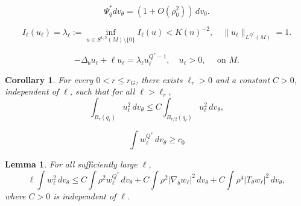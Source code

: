 \documentclass[10pt,a4paper]{amsart}
\newtheorem{corollary}{Corollary}
\newtheorem{lemma}{Lemma}
\begin{document}
\begin{equation}\label{eq:JL-volume-comparison}
\Psi_q^*dv_\theta
=
(1+O(\rho_0^2))\,dv_0 .
\end{equation}

		\begin{equation}\label{eqnmin}
			I_\ell(u_\ell)=\lambda_\ell:=\inf_{u\in S^{1,2}(M)\setminus\{0\}} I_\ell(u)<K(n)^{-2},\quad\|u_\ell\|_{L^{Q^*}(M)}=1.
		\end{equation}

		\begin{equation}\label{eqnEL}
			-\Delta_b u_\ell+\ell u_\ell=\lambda_\ell u_\ell^{Q^*-1}, \quad u_\ell > 0, \quad \text { on } M .
		\end{equation}

	\begin{corollary}\label{estimatering}
		For every \(0 < r \le r_G\), there exists  \(\ell_r>0\) and a constant \(C>0\), independent of \(\ell\), such that for all \(\ell>\ell_r\),
		\[
		\int_{B_{r}(q_\ell)} u_\ell^2\,dv_\theta \le C\int_{B_{r/2}(q_\ell)} u_\ell^2\,dv_\theta,
		\]
	\end{corollary}

\begin{equation}\label{eq:cutoff-mass-lower}
\int w_\ell^{Q^*}\,dv_\theta\ge c_0
\end{equation}

\begin{lemma}\label{lemmapohozaev}
For all sufficiently large \(\ell\),
\[
\ell\int w_\ell^2\,dv_\theta
\le
C\int \rho^2w_\ell^{Q^*}\,dv_\theta
+
C\int \rho^2|\nabla_bw_\ell|^2\,dv_\theta 
+
C\int \rho^4|T_\theta w_\ell|^2\,dv_\theta,
\]
where \(C>0\) is independent of \(\ell\).
\end{lemma}
\end{document}
